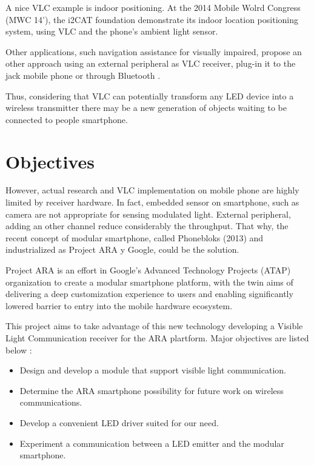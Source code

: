 A nice VLC example is indoor positioning. At the 2014 Mobile Wolrd Congress (MWC 14'), the i2CAT foundation demonstrate its indoor location positioning system, using VLC and the phone's ambient light sensor.

Other applications, such navigation assistance for visually impaired, propose an other approach using an external peripheral as VLC receiver, plug-in it to the jack mobile phone or through Bluetooth \citep{bluereceiver}.

Thus, considering that VLC can potentially transform any LED device into a wireless transmitter there may be a new generation of objects waiting to be connected to people smartphone.



\section{Objectives}
However, actual research and VLC implementation on mobile phone are highly limited by receiver hardware. In fact, embedded sensor on smartphone, such as camera are not appropriate for sensing modulated light. External peripheral, adding an other channel reduce considerably the throughput.
That why, the recent concept of modular smartphone, called Phonebloks (2013) and industrialized as Project ARA y Google, could be the solution.

Project ARA is an effort in Google's Advanced Technology Projects (ATAP) organization to create a modular smartphone platform, with the twin aims of delivering a deep customization experience to users and enabling significantly lowered barrier to entry into the mobile hardware ecosystem.

This project aims to take advantage of this new technology developing a Visible Light Communication receiver for the ARA plartform. Major objectives are listed below :
\begin{itemize}
\item Design and develop a module that support visible light communication.
\item Determine the ARA smartphone possibility for future work on wireless communications.
\item Develop a convenient LED driver suited for our need. 
\item Experiment a communication between a LED emitter and the modular smartphone.
\end{itemize}


